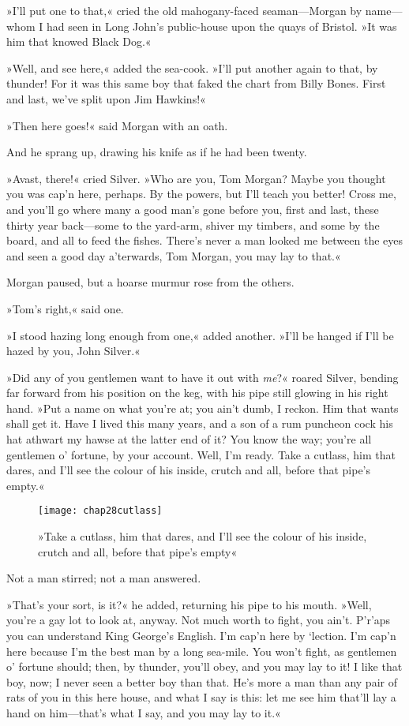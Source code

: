 »I'll put one to that,« cried the old mahogany-faced seaman—Morgan by name—whom I had seen in Long John's public-house upon the quays of Bristol. »It was him that knowed Black Dog.«

»Well, and see here,« added the sea-cook. »I'll put another again to that, by thunder! For it was this same boy that faked the chart from Billy Bones. First and last, we've split upon Jim Hawkins!«

»Then here goes!« said Morgan with an oath.

And he sprang up, drawing his knife as if he had been twenty.

»Avast, there!« cried Silver. »Who are you, Tom Morgan? Maybe you thought you was cap'n here, perhaps. By the powers, but I'll teach you better! Cross me, and you'll go where many a good man's gone before you, first and last, these thirty year back—some to the yard-arm, shiver my timbers, and some by the board, and all to feed the fishes. There's never a man looked me between the eyes and seen a good day a'terwards, Tom Morgan, you may lay to that.«

Morgan paused, but a hoarse murmur rose from the others.

»Tom's right,« said one.

»I stood hazing long enough from one,« added another. »I'll be hanged if I'll be hazed by you, John Silver.«

»Did any of you gentlemen want to have it out with \textit{me}?« roared Silver, bending far forward from his position on the keg, with his pipe still glowing in his right hand. »Put a name on what you're at; you ain't dumb, I reckon. Him that wants shall get it. Have I lived this many years, and a son of a rum puncheon cock his hat athwart my hawse at the latter end of it? You know the way; you're all gentlemen o' fortune, by your account. Well, I'm ready. Take a cutlass, him that dares, and I'll see the colour of his inside, crutch and all, before that pipe's empty.«

\begin{sidewaysfigure}
\texttt{[image: chap28cutlass]}%
\caption[»Take a cutlass, him that dares«]{»Take a cutlass, him that dares, and I'll see the colour of his inside, crutch and all, before that pipe's empty«}
\end{sidewaysfigure} 

Not a man stirred; not a man answered.

»That's your sort, is it?« he added, returning his pipe to his mouth. »Well, you're a gay lot to look at, anyway. Not much worth to fight, you ain't. P'r'aps you can understand King George's English. I'm cap'n here by `lection. I'm cap'n here because I'm the best man by a long sea-mile. You won't fight, as gentlemen o' fortune should; then, by thunder, you'll obey, and you may lay to it! I like that boy, now; I never seen a better boy than that. He's more a man than any pair of rats of you in this here house, and what I say is this: let me see him that'll lay a hand on him—that's what I say, and you may lay to it.«

